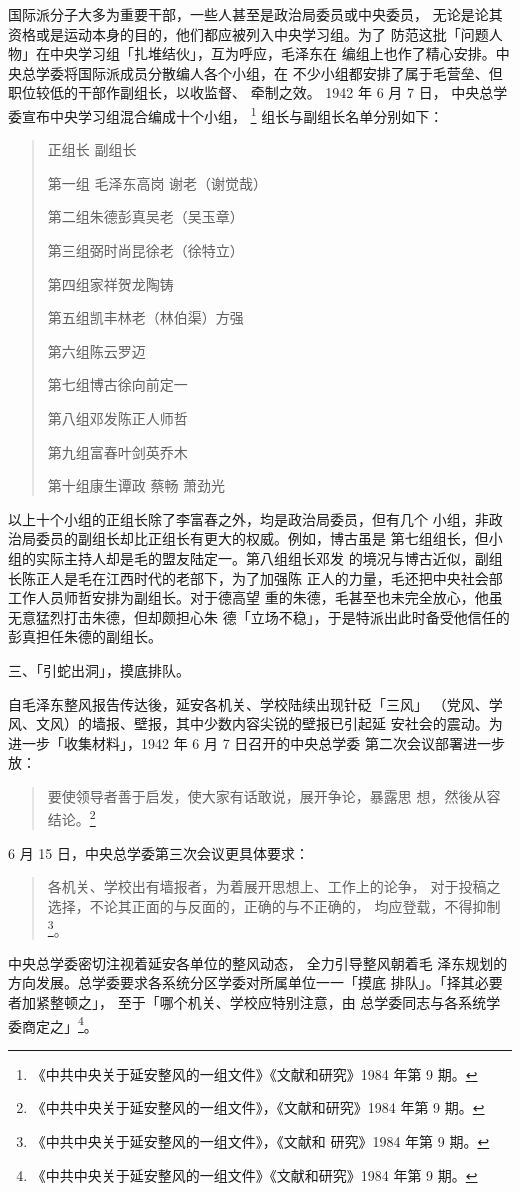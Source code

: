 国际派分子大多为重要干部，一些人甚至是政治局委员或中央委员，
无论是论其资格或是运动本身的目的，他们都应被列入中央学习组。为了
防范这批「问题人物」在中央学习组「扎堆结伙」，互为呼应，毛泽东在
编组上也作了精心安排。中央总学委将国际派成员分散编人各个小组，在
不少小组都安排了属于毛营垒、但职位较低的干部作副组长，以收监督、
牵制之效。
1942 年 6 月 7 日，
中央总学委宣布中央学习组混合编成十个小组，
\footnote{《中共中央关于延安整风的一组文件》《文献和研究》1984 年第 9 期。
}
组长与副组长名单分别如下：
\begin{quote}
	
{\fzwkai\qquad\qquad\quad  正组长\qquad
副组长

第一组 \qquad 毛泽东\qquad 高岗 \qquad 谢老（谢觉哉）

第二组\qquad 朱德\qquad 彭真\qquad 吴老（吴玉章）

第三组\qquad 弼时\qquad 尚昆\qquad 徐老（徐特立）

第四组\qquad 家祥\qquad 贺龙\qquad 陶铸

第五组\qquad 凯丰\qquad 林老（林伯渠）\qquad 方强
 

第六组\qquad 陈云\qquad 罗迈\qquad

第七组\qquad 博古\qquad 徐向前\qquad 定一

第八组\qquad 邓发\qquad 陈正人\qquad 师哲

第九组\qquad 富春\qquad 叶剑英\qquad 乔木

第十组\qquad 康生\qquad 谭政\qquad 
蔡畅\qquad
萧劲光}

\end{quote}
以上十个小组的正组长除了李富春之外，均是政治局委员，但有几个
小组，非政治局委员的副组长却比正组长有更大的权威。例如，博古虽是
第七组组长，但小组的实际主持人却是毛的盟友陆定一。第八组组长邓发
的境况与博古近似，副组长陈正人是毛在江西时代的老部下，为了加强陈
正人的力量，毛还把中央社会部工作人员师哲安排为副组长。对于德高望
重的朱德，毛甚至也未完全放心，他虽无意猛烈打击朱德，但却颇担心朱
德「立场不稳」，于是特派出此时备受他信任的彭真担任朱德的副组长。

三、「引蛇出洞」，摸底排队。

自毛泽东整风报告传达後，延安各机关、学校陆续出现针砭「三风」
（党风、学风、文风）的墙报、壁报，其中少数内容尖锐的壁报已引起延
安社会的震动。为进一步「收集材料」，1942 年 6 月 7 日召开的中央总学委
第二次会议部署进一步放：
\begin{quote}
{\fzwkai 要使领导者善于启发，使大家有话敢说，展开争论，暴露思
想，然後从容结论。\footnote{《中共中央关于延安整风的一组文件》，《文献和研究》1984 年第 9 期。}}
\end{quote}
6 月 15 日，中央总学委第三次会议更具体要求：
\begin{quote}
{\fzwkai 各机关、学校出有墙报者，为着展开思想上、工作上的论争，
对于投稿之选择，不论其正面的与反面的，正确的与不正确的，
均应登载，不得抑制\footnote{《中共中央关于延安整风的一组文件》，《文献和
研究》1984 年第 9 期。}。}
\end{quote}
中央总学委密切注视着延安各单位的整风动态，
全力引导整风朝着毛
泽东规划的方向发展。总学委要求各系统分区学委对所属单位一一「摸底
排队」。「择其必要者加紧整顿之」，
至于「哪个机关、学校应特别注意，由
总学委同志与各系统学委商定之」\footnote{《中共中央关于延安整风的一组文件》《文献和研究》1984 年第 9 期。}。

